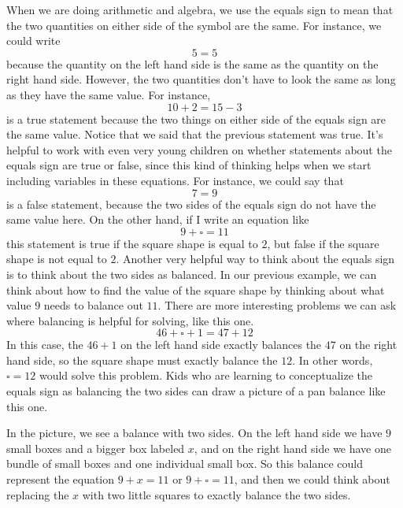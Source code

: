 \documentclass{ximera}
\begin{document}
When we are doing arithmetic and algebra, we use the equals sign to mean that the two quantities on either side of the symbol are the same. For instance, we could write
\[
5 = 5
\]
because the quantity on the left hand side is the same as the quantity on the right hand side. However, the two quantities don't have to look the same as long as they have the same value. For instance, 
\[
10 + 2 = 15 - 3
\]
is a true statement because the two things on either side of the equals sign are the same value. Notice that we said that the previous statement was true. It's helpful to work with even very young children on whether statements about the equals sign are true or false, since this kind of thinking helps when we start including variables in these equations. For instance, we could say that 
\[
7 = 9
\]
is a false statement, because the two sides of the equals sign do not have the same value here. On the other hand, if I write an equation like
\[
9 + \square = 11
\]
this statement is true if the square shape is equal to $2$, but false if the square shape is not equal to $2$. Another very helpful way to think about the equals sign is to think about the two sides as balanced. In our previous example, we can think about how to find the value of the square shape by thinking about what value $9$ needs to balance out $11$. There are more interesting problems we can ask where balancing is helpful for solving, like this one.
\[
46 + \square + 1 = 47 + 12 
\]
In this case, the $46 + 1$ on the left hand side exactly balances the $47$ on the right hand side, so the square shape must exactly balance the $12$. In other words, $\square = 12$ would solve this problem. Kids who are learning to conceptualize the equals sign as balancing the two sides can draw a picture of a pan balance like this one.
\begin{image}
\end{image}
In the picture, we see a balance with two sides. On the left hand side we have $9$ small boxes and a bigger box labeled $x$, and on the right hand side we have one bundle of small boxes and one individual small box. So this balance could represent the equation $9 + x = 11$ or $9 + \square = 11$, and then we could think about replacing the $x$ with two little squares to exactly balance the two sides.
\end{document}
